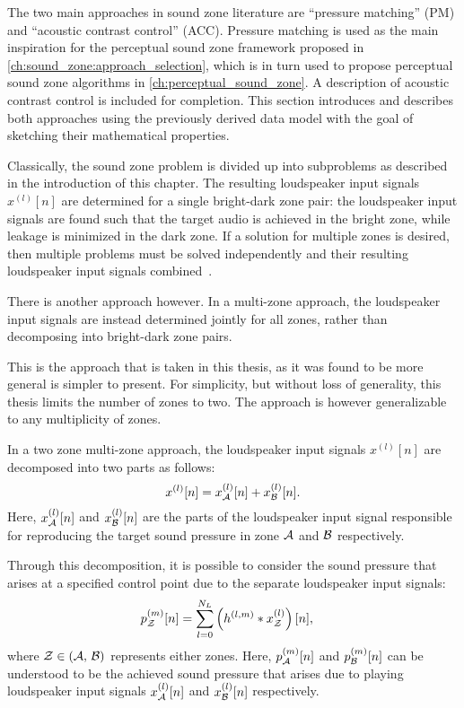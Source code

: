 The two main approaches in sound zone literature are ``pressure matching'' (PM) and ``acoustic contrast control'' (ACC).
Pressure matching is used as the main inspiration for the perceptual sound zone framework 
proposed in \autoref{ch:sound_zone:approach_selection}, which is in turn used to propose perceptual sound zone algorithms 
in \autoref{ch:perceptual_sound_zone}.
A description of acoustic contrast control is included for completion.
This section introduces and describes both approaches using the previously derived data model with the 
goal of sketching their mathematical properties.

Classically, the sound zone problem is divided up into subproblems as described in the introduction of this chapter.
The resulting loudspeaker input signals $x^{(l)}[n]$ are determined for a single bright-dark zone pair:
the loudspeaker input signals are found such that the target audio is achieved in the bright zone, while leakage is minimized in the dark zone.
If a solution for multiple zones is desired, then multiple problems must be solved independently and their resulting loudspeaker input signals combined~\cite{betlehem2015personal}.

There is another approach however.
In a multi-zone approach, the loudspeaker input signals are instead determined jointly for all zones, 
rather than decomposing into bright-dark zone pairs.

This is the approach that is taken in this thesis, as it was found to be more general is simpler to present.
For simplicity, but without loss of generality, this thesis limits the number of zones to two.
The approach is however generalizable to any multiplicity of zones.

In a two zone multi-zone approach, the loudspeaker input signals $x^{(l)}[n]$ are decomposed into two parts as follows:
\begin{equation}
    x^{(l)}[n] = x_{\mathcal{A}}^{(l)}[n] + x_{\mathcal{B}}^{(l)}[n].
\end{equation}
Here, $x_{\mathcal{A}}^{(l)}[n]$ and $x_{\mathcal{B}}^{(l)}[n]$ are the parts of the loudspeaker input signal responsible for reproducing the target sound pressure 
in zone $\mathcal{A}$ and $\mathcal{B}$ respectively.

Through this decomposition, it is possible to consider the sound pressure that arises at a specified control point due to the separate loudspeaker input signals:
\begin{align}
    p_{\mathcal{Z}}^{(m)}[n] &= \sum_{l=0}^{N_L} \left(h^{(l,m)} \ast x_{\mathcal{Z}}^{(l)}\right)[n],
\end{align}
\label{eq:sound_zone:approaches:pressure}
where $\mathcal{Z} \in \left(\mathcal{A},\,\mathcal{B}\right)$ represents either zones.
Here, $p_{\mathcal{A}}^{(m)}[n]$ and $p_{\mathcal{B}}^{(m)}[n]$ can be understood to be the achieved sound pressure that arises due to 
playing loudspeaker input signals $x_{\mathcal{A}}^{(l)}[n]$ and $x_{\mathcal{B}}^{(l)}[n]$ respectively. 

